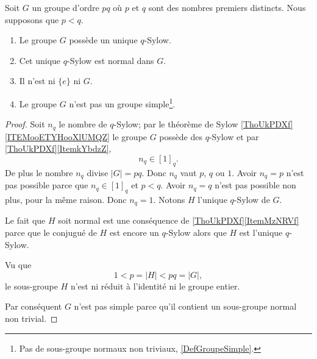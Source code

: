 \begin{lemma}
    Soit \( G\) un groupe d'ordre \( pq\) où \( p\) et \( q\) sont des nombres premiers distincts. Nous supposons que \( p<q\).    
    \begin{enumerate}
        \item
            Le groupe \( G\) possède un unique \( q\)-Sylow.
        \item
            Cet unique \( q\)-Sylow est normal dans \( G\).
        \item
            Il n'est ni \( \{ e \}\) ni \( G\).
        \item
            Le groupe \( G\) n'est pas un groupe simple\footnote{Pas de sous-groupe normaux non triviaux, \ref{DefGroupeSimple}.}.
    \end{enumerate}
\end{lemma}

\begin{proof}
    Soit \( n_q\) le nombre de \( q\)-Sylow; par le théorème de Sylow \ref{ThoUkPDXf}\ref{ITEMooETYHooXlUMQZ} le groupe \( G\) possède des \( q\)-Sylow et par \ref{ThoUkPDXf}\ref{ItemkYbdzZ},
    \begin{equation}
        n_q\in[1]_q.
    \end{equation}
    De plus le nombre \( n_q\) divise \( | G |=pq\). Donc \( n_q\) vaut \( p\), \( q\) ou \( 1\). Avoir \( n_q=p\) n'est pas possible parce que \( n_q\in[1]_q\) et \( p<q\). Avoir \( n_q=q\) n'est pas possible non plus, pour la même raison. Donc \( n_q=1\). Notons \( H\) l'unique \( q\)-Sylow de \( G\).

    Le fait que \( H\) soit normal est une conséquence de \ref{ThoUkPDXf}\ref{ItemMzNRVf} parce que le conjugué de \( H\) est encore un \( q\)-Sylow alors que \( H\) est l'unique \( q\)-Sylow. 

    Vu que
    \begin{equation}
        1<p=| H |<pq=| G |,
    \end{equation}
    le sous-groupe \( H \) n'est ni réduit à l'identité ni le groupe entier.

    Par conséquent \( G\) n'est pas simple parce qu'il contient un sous-groupe normal non trivial.
\end{proof}

